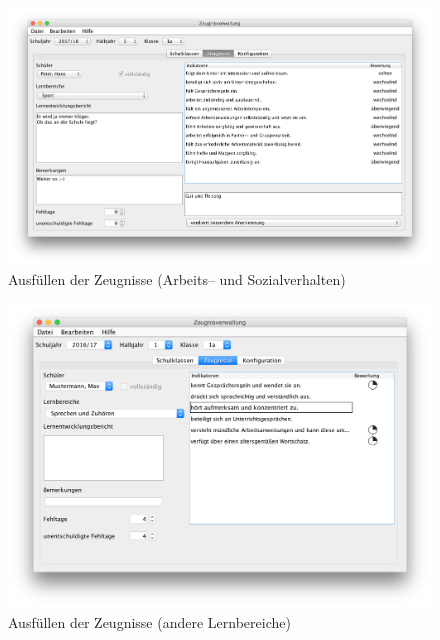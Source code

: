 \documentclass[a4paper,notitlepage,parskip]{scrartcl}
\begin{document}
\begin{figure}[ht]
\centering
\centerline{\includegraphics[width=1.0\textwidth]{Zeugnisse}}
\caption{Ausfüllen der Zeugnisse (Arbeits-- und Sozialverhalten)}
\label{fig:Zeugnisse}
\end{figure}

\begin{figure}[ht]
\centering
\centerline{\includegraphics[width=1.0\textwidth]{Zeugnisse2}}
\caption{Ausfüllen der Zeugnisse (andere Lernbereiche)}
\label{fig:Zeugnisse2}
\end{figure}
\end{document}
